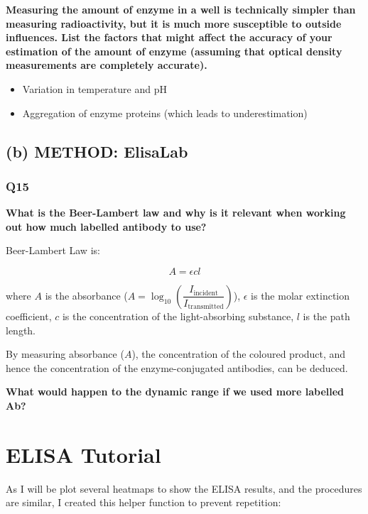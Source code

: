\documentclass[
]{article}
\providecommand{\tightlist}{%
  \setlength{\itemsep}{0pt}\setlength{\parskip}{0pt}}
\begin{document}
\textbf{Measuring the amount of enzyme in a well is technically simpler than measuring radioactivity, but it is much more susceptible to outside influences. List the factors that might affect the accuracy of your estimation of the amount of enzyme (assuming that optical density measurements are completely accurate).}

\begin{itemize}
\tightlist
\item
  Variation in temperature and pH
\item
  Aggregation of enzyme proteins (which leads to underestimation)
\end{itemize}

\hypertarget{b-method-elisalab}{%
\subsection*{(b) METHOD: ElisaLab}\label{b-method-elisalab}}

\hypertarget{q15}{%
\subsubsection*{Q15}\label{q15}}

\textbf{What is the Beer-Lambert law and why is it relevant when working out how much labelled antibody to use?}

Beer-Lambert Law is:

\[A = \epsilon cl\]

where \(A\) is the absorbance (\(A=\log_{10}\left(\dfrac{I_\text{incident}}{I_\text{transmitted}}\right)\)), \(\epsilon\) is the molar extinction coefficient, \(c\) is the concentration of the light-absorbing substance, \(l\) is the path length.

By measuring absorbance (\(A\)), the concentration of the coloured product, and hence the concentration of the enzyme-conjugated antibodies, can be deduced.

\textbf{What would happen to the dynamic range if we used more labelled Ab?}

\hypertarget{etut}{%
\section{ELISA Tutorial}\label{etut}}

As I will be plot several heatmaps to show the ELISA results, and the procedures are similar, I created this helper function to prevent repetition:
\end{document}
